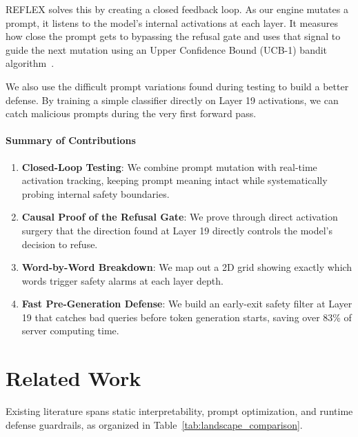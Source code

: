 \documentclass[manuscript,screen,review,anonymous]{acmart}
\begin{document}
REFLEX solves this by creating a closed feedback loop. As our engine mutates a prompt, it listens to the model's internal activations at each layer. It measures how close the prompt gets to bypassing the refusal gate and uses that signal to guide the next mutation using an Upper Confidence Bound (UCB-1) bandit algorithm~\cite{auer2002finite}. 

We also use the difficult prompt variations found during testing to build a better defense. By training a simple classifier directly on Layer 19 activations, we can catch malicious prompts during the very first forward pass.

\paragraph{Summary of Contributions}
\begin{enumerate}
    \item \textbf{Closed-Loop Testing}: We combine prompt mutation with real-time activation tracking, keeping prompt meaning intact while systematically probing internal safety boundaries.
    \item \textbf{Causal Proof of the Refusal Gate}: We prove through direct activation surgery that the direction found at Layer 19 directly controls the model's decision to refuse.
    \item \textbf{Word-by-Word Breakdown}: We map out a 2D grid showing exactly which words trigger safety alarms at each layer depth.
    \item \textbf{Fast Pre-Generation Defense}: We build an early-exit safety filter at Layer 19 that catches bad queries before token generation starts, saving over 83\% of server computing time.
\end{enumerate}

\section{Related Work}
Existing literature spans static interpretability, prompt optimization, and runtime defense guardrails, as organized in Table~\ref{tab:landscape_comparison}.
\end{document}
